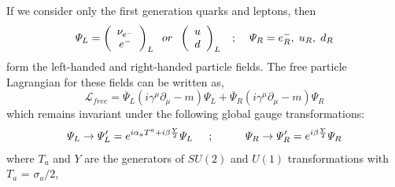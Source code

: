 
\vspace{-0.2in}
If we consider only the first generation quarks and leptons, then
\begin{equation}
\Psi_{L} = 
\left(
\begin{array}{c}
\nu_{e^{-}}\\
e^{-}\\
\end{array}
\right)_{L}
\hspace{0.2cm} or \hspace{0.2cm}\left(
\begin{array}{c}
u \\
d \\
\end{array}
\right)_{L}
\hspace{0.3cm}; \hspace{0.4cm} \Psi_{R} = e^{-}_{R}, \hspace{0.1cm} u_{R}, \hspace{0.1cm} d_{R}
\end{equation}
form the left-handed and right-handed particle fields. The free particle Lagrangian for these fields can be written as,
\begin{equation}
\mathcal{L}_{free} = \overline{\Psi}_{L}(i\gamma^{\mu}\partial_{\mu} - m){\Psi}_{L} + \overline{\Psi}_{R}(i\gamma^{\mu}\partial_{\mu} - m){\Psi}_{R}
\label{eg:EWfree}
\end{equation}
which remains invariant under the following global gauge transformations:
\begin{equation}
  \begin{split}
   \Psi_{L} \rightarrow \Psi^{\prime}_{L} = e^{i{\alpha_{a}}T^{a}+i{\beta}\frac{Y}{2}}{\Psi_{L}} \hspace{0.2 in} ; \hspace{0.4 in} 
   \Psi_{R} \rightarrow \Psi^{\prime}_{R} = e^{i{\beta}\frac{Y}{2}}{\Psi_{R}} %
  \label{eg:EWKGlobalphase}
  \end{split}
\end{equation}
where $T_a$ and $Y$ are the generators of $SU(2)$ and $U(1)$ transformations with $T_a$ = $\sigma_{a}/2$,
